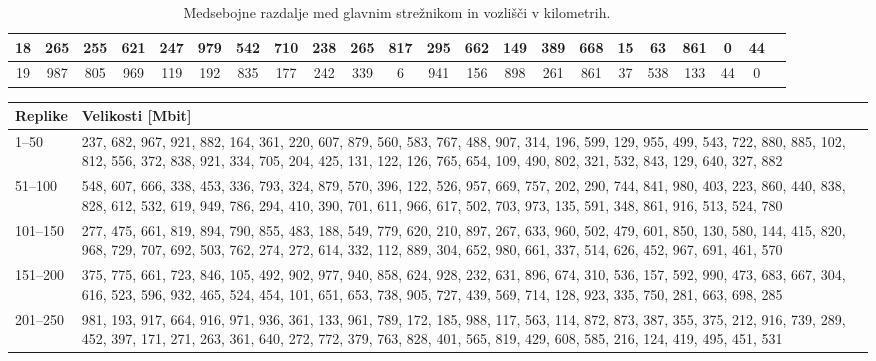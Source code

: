 \documentclass[a4paper, 12pt]{book}
\begin{document}
\begin{appendices}
\begin{table}[h]
\begin{center}
\begin{tabulary}{1.0\textwidth}{
       | C | C | C | C | C | C | C | C | C | C | C | C | C | C | C | C | C | C | C | C | C | C |
    }
18 & 265 & 255 & 621 & 247 & 979 & 542 & 710 & 238 & 265 & 817 & 295 & 662 & 149 & 389 & 668 & 15 & 63 & 861 & 0 & 44 \\ \hline

19 & 987 & 805 & 969 & 119 & 192 & 835 & 177 & 242 & 339 & 6 & 941 & 156 & 898 & 261 & 861 & 37 & 538 & 133 & 44 & 0 \\ \hline

    \end{tabulary}
  \end{center}

  \caption{Medsebojne razdalje med glavnim strežnikom in vozlišči v \mbox{kilometrih}.}
  \label{tbl:sim_node_dist}
\end{table}


\begin{table}
\tiny
  \begin{center}
    \begin{tabulary}{1.0\textwidth}{p{1.3cm} p{11.58cm}}
      {\scriptsize Replike} & {\scriptsize Velikosti [Mbit]} \\
      --50 & 237, 682, 967, 921, 882, 164, 361, 220, 607, 879, 560, 583, 767, 488, 907, 314, 196, 599, 129, 955, 499, 543, 722, 880, 885, 102, 812, 556, 372, 838, 921, 334, 705, 204, 425, 131, 122, 126, 765, 654, 109, 490, 802, 321, 532, 843, 129, 640, 327, 882 \\
      51--100 & 548, 607, 666, 338, 453, 336, 793, 324, 879, 570, 396, 122, 526, 957, 669, 757, 202, 290, 744, 841, 980, 403, 223, 860, 440, 838, 828, 612, 532, 619, 949, 786, 294, 410, 390, 701, 611, 966, 617, 502, 703, 973, 135, 591, 348, 861, 916, 513, 524, 780 \\
      101--150 & 277, 475, 661, 819, 894, 790, 855, 483, 188, 549, 779, 620, 210, 897, 267, 633, 960, 502, 479, 601, 850, 130, 580, 144, 415, 820, 968, 729, 707, 692, 503, 762, 274, 272, 614, 332, 112, 889, 304, 652, 980, 661, 337, 514, 626, 452, 967, 691, 461, 570 \\
      151--200 & 375, 775, 661, 723, 846, 105, 492, 902, 977, 940, 858, 624, 928, 232, 631, 896, 674, 310, 536, 157, 592, 990, 473, 683, 667, 304, 616, 523, 596, 932, 465, 524, 454, 101, 651, 653, 738, 905, 727, 439, 569, 714, 128, 923, 335, 750, 281, 663, 698, 285 \\
      201--250 & 981, 193, 917, 664, 916, 971, 936, 361, 133, 961, 789, 172, 185, 988, 117, 563, 114, 872, 873, 387, 355, 375, 212, 916, 739, 289, 452, 397, 171, 271, 263, 361, 640, 272, 772, 379, 763, 828, 401, 565, 819, 429, 608, 585, 216, 124, 419, 495, 451, 531 \\

\end{tabulary}
\end{center}
\end{table}
\end{appendices}
\end{document}
